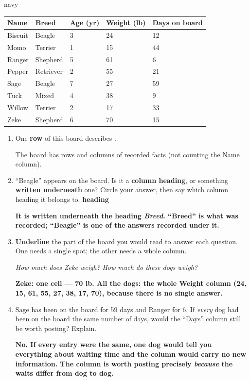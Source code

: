 \documentclass[12pt]{article}
\newcommand{\answerspace}[2]{\par\nopagebreak\noindent\begin{minipage}[t][#1][t]{\linewidth}%
  \color{keyred}\bfseries #2\end{minipage}\par}
\begin{document}
\begin{scenariobox}{navy}
\small
\renewcommand{\arraystretch}{1.25}
\begin{tabularx}{\linewidth}{@{} l Y Y Y Y @{}}
\textbf{Name} & \textbf{Breed} & \textbf{Age (yr)} & \textbf{Weight (lb)} & \textbf{Days on board} \\
\hline
Biscuit & Beagle    & 3 & 24 & 12 \\
Momo    & Terrier   & 1 & 15 & 44 \\
Ranger  & Shepherd  & 5 & 61 &  6 \\
Pepper  & Retriever & 2 & 55 & 21 \\
Sage    & Beagle    & 7 & 27 & 59 \\
Tuck    & Mixed     & 4 & 38 &  9 \\
Willow  & Terrier   & 2 & 17 & 33 \\
Zeke    & Shepherd  & 6 & 70 & 15 \\
\hline
\end{tabularx}

\normalsize
\begin{enumerate}[label=\textbf{\alph*.}, leftmargin=1.8em, itemsep=8pt]
  \item One \textbf{row} of this board describes .

        The board has  rows and  columns of recorded facts
        (not counting the Name column).
  \item ``Beagle'' appears on the board. Is it a \textbf{column heading}, or something
        \textbf{written underneath} one? Circle your answer, then say which column heading it
        belongs to. \hfill \textbf{heading} \qquad {}
        \answerspace{1.4cm}{It is written underneath the heading \emph{Breed}. ``Breed'' is
        what was recorded; ``Beagle'' is one of the answers recorded under it.}
  \item \textbf{Underline} the part of the board you would read to answer each question.
        One needs a single spot; the other needs a whole column.

        \emph{How much does Zeke weigh?} \qquad \emph{How much do these dogs weigh?}
        \answerspace{1.6cm}{Zeke: one cell --- 70 lb. All the dogs: the whole Weight column
        (24, 15, 61, 55, 27, 38, 17, 70), because there is no single answer.}
  \item Sage has been on the board for 59 days and Ranger for 6. If \emph{every} dog had been
        on the board the same number of days, would the ``Days'' column still be worth posting?
        Explain.
        \answerspace{2.0cm}{No. If every entry were the same, one dog would tell you everything
        about waiting time and the column would carry no new information. The column is worth
        posting precisely \emph{because} the waits differ from dog to dog.}
\end{enumerate}
\end{scenariobox}
\end{document}
